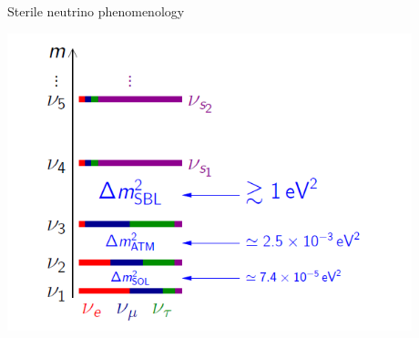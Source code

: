 %
%
%

\begin{frame}[t]{Sterile neutrino phenomenology}

  \begin{center}
    \includegraphics[width=0.88\textwidth]{./images/osc101/3p2_mass_states}\\
  \end{center}

\end{frame}

%
%
%

